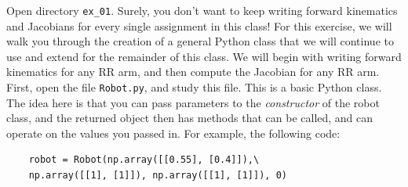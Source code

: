 \documentclass{16384_doc} %
\begin{document}
\begin{questions}
    Open directory \verb!ex_01!.
    Surely, you don't want to keep writing forward kinematics and Jacobians for
    every single assignment in this class!
    For this exercise, we will walk you through the creation of a general Python
    class that we will continue to use and extend for the remainder of this
    class. We will begin with writing forward kinematics for any RR arm, and
    then compute the Jacobian for any RR arm.
    First, open the file \verb!Robot.py!, and study this file. This is a basic Python
    class. The idea here is that you can pass parameters to the \emph{constructor} of
    the robot class, and the returned object then has methods that can be
    called, and can operate on the values you passed in. For example, the
    following code:
    \begin{verbatim}
    robot = Robot(np.array([[0.55], [0.4]]),\
    np.array([[1], [1]]), np.array([[1], [1]]), 0)


\end{verbatim}
\end{questions}
\end{document}
